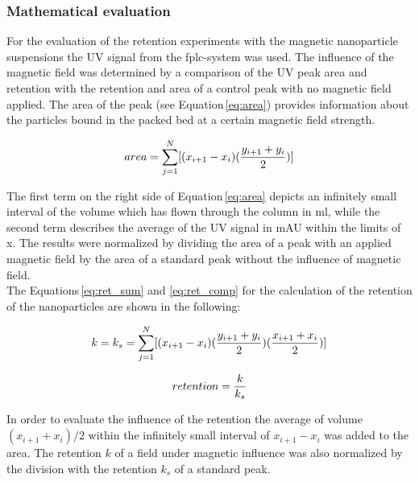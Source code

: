 \subsubsection{Mathematical evaluation}
\label{subsubsec:Math_eval}
For the evaluation of the retention experiments with the magnetic nanoparticle suspensions the UV signal from the \gls{fplc}-system was used. The influence of the magnetic field was determined by a comparison of the UV peak area and retention with the retention and area of a control peak with no magnetic field applied. The area of the peak (see Equation\,\ref{eq:area}) provides information about the particles bound in the packed bed at a certain magnetic field strength.    

\begin{equation}
\label{eq:area}
\centering
area = \sum_{j=1}^{N}[(x_{i+1}-x_{i})(\frac{y_{i+1}+y_{i}}{2})]
\end{equation}

The first term on the right side of Equation\,\ref{eq:area} depicts an infinitely small interval of the volume which has flown through the column in ml, while the second term describes the average of the UV signal in mAU within the limits of x. The results were normalized by dividing the area of a peak with an applied magnetic field by the area of a standard peak without the influence of magnetic field. \\


The Equations\,\ref{eq:ret_sum} and \ref{eq:ret_comp} for the calculation of the retention of the nanoparticles are shown in the following:

\begin{equation}
\label{eq:ret_sum}
\centering
k = k_{s} = \sum_{j=1}^{N}[(x_{i+1}-x_{i})(\frac{y_{i+1}+y_{i}}{2})(\frac{x_{i+1}+x_{i}}{2})]
\end{equation}

\begin{equation}
\label{eq:ret_comp}
\centering
retention = \frac{k}{k_{s}}
\end{equation}

In order to evaluate the influence of the retention the average of volume $(x_{i+1}+x_{i})/2$ within the infinitely small interval of $x_{i+1}-x_{i}$ was added to the area. The retention $k$ of a field under magnetic influence was also normalized by the division with the retention $k_{s}$ of a standard peak.   

